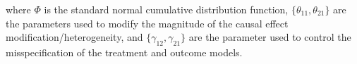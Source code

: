 \documentclass[letterpaper]{article} %
\begin{document}
where $\Phi$ is the standard normal cumulative distribution function, $\{\theta_{11},\theta_{21}\}$ are the parameters used to modify the magnitude of the causal effect modification/heterogeneity, and $\{\gamma_{12},\gamma_{21}\}$ are the parameter used to control the misspecification of the treatment and outcome models. %
\end{document}
